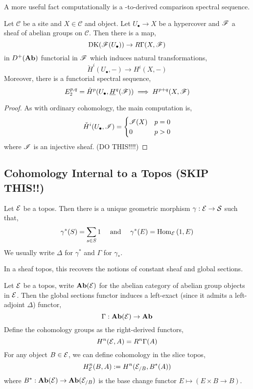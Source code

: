 \documentclass[12pt]{article}
\renewcommand{\C}{\mathcal{C}}
\newcommand{\DK}{\mathrm{DK}}
\renewcommand{\Cech}{\text{\v{C}ech}\xspace}
\begin{document}
A more useful fact computationally is a \Cech-to-derived comparison spectral sequence.

\begin{prop}
Let $\C$ be a site and $X \in \C$ and object. Let $U_\bullet \to X$ be a hypercover and $\mathscr{F}$ a sheaf of abelian groups on $\C$. Then there is a map,
\[ \DK(\F(U_\bullet)) \to R \Gamma(X, \F) \]
in $D^+(\mathbf{Ab})$ functorial in $\mathscr{F}$ which induces natural transformations,
\[ \check{H}^i(U_\bullet, -) \to H^i(X, -) \]
Moreover, there is a functorial spectral sequence,
\[ E^{p,q}_2 = \check{H}^p(U_\bullet, \underline{H}^q(\mathscr{F})) \implies H^{p+q}(X, \mathscr{F}) \]
\end{prop}

\begin{proof}
As with ordinary \Cech cohomology, the main computation is,
\[ \check{H}^i(U_\bullet, \mathscr{I}) = 
\begin{cases}
\mathscr{I}(X) & p = 0
\\
0 & p > 0
\end{cases} \]
where $\mathscr{I}$ is an injective sheaf. (DO THIS!!!!)
\end{proof}

\subsection{Cohomology Internal to a Topos (SKIP THIS!!)}

\begin{defn}
Let $\mathcal{E}$ be a topos. Then there is a unique geometric morphism $\gamma : \mathcal{E} \to \mathcal{S}$ such that,
\[ \gamma^*(S) = \sum_{s \in S} 1 \quad \text{ and } \quad \gamma^*(E) = \mathrm{Hom}_{\mathcal{E}} \left( 1, E \right) \]
We usually write $\Delta$ for $\gamma^*$ and $\Gamma$ for $\gamma_*$.
\end{defn}

\begin{rmk}
In a sheaf topos, this recovers the notions of constant sheaf and global sections.
\end{rmk}

\begin{defn}
Let $\mathcal{E}$ be a topos, write $\mathbf{Ab}(\mathcal{E})$ for the abelian category of abelian group objects in $\mathcal{E}$. Then the global sections functor induces a left-exact (since it admits a left-adjoint $\Delta$) functor,
\[ \Gamma : \mathbf{Ab}(\mathcal{E}) \to \mathbf{Ab} \]
Define the cohomology groups as the right-derived functors,
\[ H^n(\mathcal{E}, A) = R^n \Gamma(A) \]
For any object $B \in \mathcal{E}$, we can define cohomology in the slice topos,
\[ H^n_{\mathcal{E}}(B, A) := H^n(\mathcal{E}_{/B}, B^*(A)) \]
where $B^* : \mathbf{Ab}(\mathcal{E}) \to \mathbf{Ab}(\mathcal{E}_{/B})$ is the base change functor $E \mapsto (E \times B \to B)$. 
\end{defn}
\end{document}

